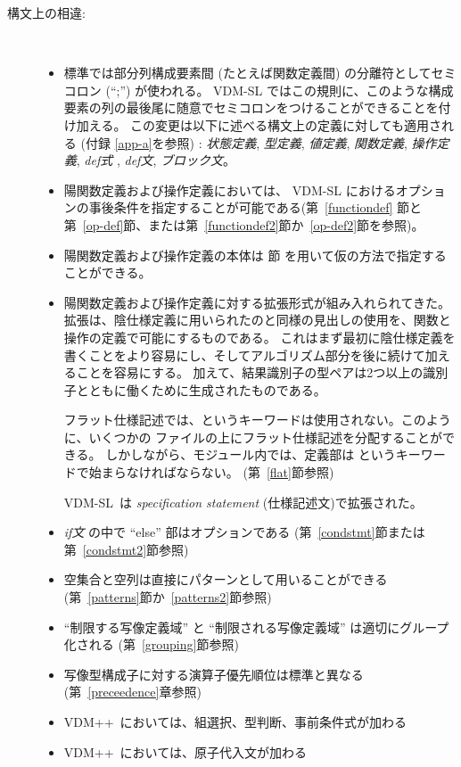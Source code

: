 \documentclass[\pformat,12pt]{jarticle}
\newcommand{\vdmslpp}[2]{%
#1
}
\newcommand{\vdmsl}{VDM-SL}
\newcommand{\vdmpp}{VDM++}
\begin{document}
\begin{description}
\item[構文上の相違:]\mbox{}\\
  \begin{itemize}
  
  \item 標準では部分列構成要素間 (たとえば関数定義間) の分離符としてセミコロン (``;'') が使われる。
  \vdmslpp{\vdmsl}{\vdmpp} ではこの規則に、このような構成要素の列の最後尾に随意でセミコロンをつけることができることを付け加える。
この変更は以下に述べる構文上の定義に対しても適用される (付録 \ref{app-a}を参照)
: \vdmslpp{{\em 状態定義},}{} {\em 型定義}, {\em 値定義},
    {\em 関数定義}, {\em 操作定義}, {\em def式
    }, {\em def文}, {\em ブロック文}。

  \item 陽関数定義および操作定義においては、 \vdmslpp{VDM-SL}{\vdmpp} におけるオプションの事後条件を指定することが可能である(第~\ref{functiondef} 節と第~\ref{op-def}節、または第~\ref{functiondef2}節か~\ref{op-def2}節を参照)。

  \item 陽関数定義および操作定義の本体は \vdmslpp{節}{節
    \keyw{is subclass responsibility}と}を用いて仮の方法で指定することができる。

    
  \item 陽関数定義および操作定義に対する拡張形式が組み入れられてきた。
拡張は、陰仕様定義に用いられたのと同様の見出しの使用を、関数と操作の定義で可能にするものである。
これはまず最初に陰仕様定義を書くことをより容易にし、そしてアルゴリズム部分を後に続けて加えることを容易にする。 
加えて、結果識別子の型ペアは2つ以上の識別子とともに働くために生成されたものである。

  フラット仕様記述では、というキーワードは使用されない。このように、いくつかの
ファイルの上にフラット仕様記述を分配することができる。
しかしながら、モジュール内では、定義部は というキーワードで始まらなければならない。
(第~\ref{flat}節参照)

  \vdmsl\ は {\em specification statement} (仕様記述文)で拡張された。

  \item  {\it if文\/} の中で ``else'' 部はオプションである (第~\ref{condstmt}節または第~\ref{condstmt2}節参照)
        
  \item 空集合と空列は直接にパターンとして用いることができる (第~\ref{patterns}節か~\ref{patterns2}節参照)
  \item ``制限する写像定義域'' と ``制限される写像定義域'' は適切にグループ化される (第~\ref{grouping}節参照)
  \item 写像型構成子に対する演算子優先順位は標準と異なる (第~\ref{preceedence}章参照)
  \item \vdmpp\ においては、組選択、型判断、事前条件式が加わる
  \item \vdmpp\ においては、原子代入文が加わる



\end{itemize}
\end{description}
\end{document}
